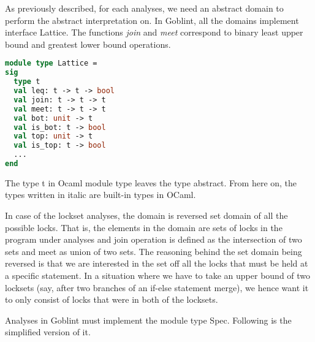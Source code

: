 \documentclass[..thesis.tex]{subfiles}
\begin{document}

As previously described, for each analyses, we need an abstract domain to perform the abstract interpretation on. In Goblint, all the domains implement interface Lattice. The functions \textit{join} and \textit{meet} correspond to binary least upper bound and greatest lower bound operations. 


\begin{lstlisting}[language=Caml,style=caml]
module type Lattice =
sig
  type t
  val leq: t -> t -> bool
  val join: t -> t -> t
  val meet: t -> t -> t
  val bot: unit -> t
  val is_bot: t -> bool
  val top: unit -> t
  val is_top: t -> bool
  ...
end
\end{lstlisting}

The type t in Ocaml module type leaves the type abstract. From here on, the types written in italic are built-in types in OCaml. 



In case of the lockset analyses, the domain is reversed set domain of all the possible locks. That is, the elements in the domain are sets of locks in the program under analyses and join operation is defined as the intersection of two sets and meet as union of two sets. The reasoning behind the set domain being reversed is that we are interested in the set off all the locks that must be held at a specific statement. In a situation where we have to take an upper bound of two locksets (say, after two branches of an if-else statement merge), we hence want it to only consist of locks that were in both of the locksets.

Analyses in Goblint must implement the module type Spec. Following is the simplified version of it.

\end{document}
